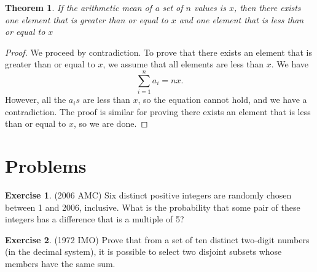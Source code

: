 \documentclass[l1pt]{article}
\theoremstyle{plain}
\newtheorem{thm}{Theorem}[section]
\theoremstyle{definition}
\newtheorem{exercise}{Exercise}[section]
\theoremstyle{remark}
\begin{document}
\begin{mdframed}
    \begin{thm}
    If the arithmetic mean of a set of $n$ values is $x$, then there exists one element that is greater than or equal to $x$ and one element that is less than or equal to $x$
    \end{thm}
\end{mdframed}

\begin{proof}
We proceed by contradiction. To prove that there exists an element that is greater than or equal to $x$, we assume that all elements are less than $x$. We have \[\sum_{i=1}^n a_i=nx .\] However, all the $a_is$ are less than $x$, so the equation cannot hold, and we have a contradiction. The proof is similar for proving there exists an element that is less than or equal to $x$, so we are done.
\end{proof}






\section{Problems}

\begin{exercise}
(2006 AMC) Six distinct positive integers are randomly chosen between 1 and 2006, inclusive. What is the probability that some pair of these integers has a difference that is a multiple of 5?
\end{exercise}

\begin{exercise}
(1972 IMO) Prove that from a set of ten distinct two-digit numbers (in the decimal system), it is possible to select two disjoint subsets whose members have the same sum.
\end{exercise}
\end{document}
